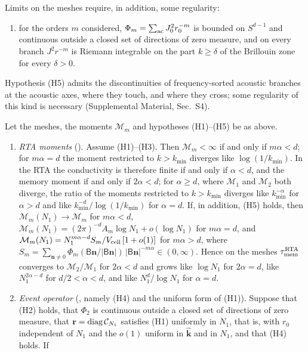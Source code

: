 Limits on the meshes require, in addition, some regularity:
\begin{enumerate}
\item[(H5)] for the orders $m$ considered, $\Phi_m=\sum_{\rm ac}J_0^2r_0^{-m}$ is bounded on $S^{d-1}$ and
continuous outside a closed set of directions of zero measure, and on every branch $J^2r^{-m}$ is Riemann
integrable on the part $k\ge\delta$ of the Brillouin zone for every $\delta>0$.
\end{enumerate}
Hypothesis (H5) admits the discontinuities of frequency-sorted acoustic branches at the acoustic axes,
where they touch, and where they cross; some regularity of this kind is necessary (Supplemental Material,
Sec.~S4).

\begin{theorem}\label{thm:ir}
Let the meshes, the moments $\mathcal M_m$ and hypotheses (H1)--(H5) be as above.
\begin{enumerate}
\item[(i)] \emph{RTA moments} (). Assume (H1)--(H3). Then $\mathcal M_m<\infty$ if and
only if $m\alpha<d$; for $m\alpha=d$ the moment restricted to $k>k_{\min}$ diverges like $\log(1/k_{\min})$.
In the RTA the conductivity is therefore finite if and only if $\alpha<d$, and the memory moment if and
only if $2\alpha<d$; for $\alpha\ge d$, where $\mathcal M_1$ and $\mathcal M_2$ both diverge, the ratio of
the moments restricted to $k>k_{\min}$ diverges like $k_{\min}^{-\alpha}$ for $\alpha>d$ and like
$k_{\min}^{-d}/\log(1/k_{\min})$ for $\alpha=d$. If, in addition, (H5) holds, then
$\mathcal M_m(N_1)\to\mathcal M_m$ for $m\alpha<d$,
$\mathcal M_m(N_1)=(2\pi)^{-d}A_m\log N_1+o(\log N_1)$ for $m\alpha=d$, and
$\mathcal M_m(N_1)=N_1^{m\alpha-d}S_m/V_{\rm cell}\,[1+o(1)]$ for $m\alpha>d$, where
$S_m=\sum_{\mathbf n\ne0}\Phi_m(\mathsf B\mathbf n/|\mathsf B\mathbf n|)\,|\mathsf B\mathbf n|^{-m\alpha}\in(0,\infty)$.
Hence on the meshes $\tau_{\rm mem}^{\rm RTA}$ converges to $\mathcal M_2/\mathcal M_1$ for $2\alpha<d$ and grows
like $\log N_1$ for $2\alpha=d$, like $N_1^{2\alpha-d}$ for $d/2<\alpha<d$, and like $N_1^d/\log N_1$ for
$\alpha=d$.
\item[(ii)] \emph{Event operator} (, namely (H4) and the uniform form of
(H1)). Suppose that (H2) holds, that $\Phi_2$ is continuous outside a closed set of directions of zero
measure, that $\mathbf r=\mathrm{diag}\,\mathcal C_{N_1}$ satisfies (H1) uniformly in $N_1$, that is, with $r_0$
independent of $N_1$ and the $o(1)$ uniform in $\hat{\mathbf k}$ and in $N_1$, and that (H4) holds. If

\end{enumerate}
\end{theorem}

